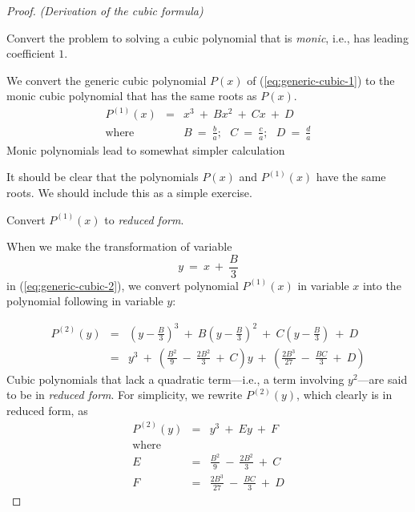 \begin{proof} {\it (Derivation of the cubic formula)}

 Convert the problem to solving a
cubic polynomial that is {\em monic}, 
i.e., has leading coefficient $1$.


\noindent
We convert the generic cubic polynomial $P(x)$ of
(\ref{eq:generic-cubic-1}) to the monic cubic polynomial that has the
same roots as $P(x)$.
\begin{eqnarray}
\label{eq:generic-cubic-2}
P^{(1)}(x) & = &  x^3 \ + \ Bx^2 \ + \ Cx \ + \ D \\
\nonumber
\mbox{where} & &
B \ = \ \frac{b}{a}; \ \ \
C \ = \ \frac{c}{a}; \ \ \
D \ = \ \frac{d}{a}
\end{eqnarray}
Monic polynomials lead to somewhat simpler calculation

It should be clear that the polynomials $P(x)$ and $P^{(1)}(x)$ have
the same roots.  {\Arny We should include this as a simple exercise.}

\medskip

 Convert $P^{(1)}(x)$ to {\em reduced form}.

\noindent
When we make the transformation of variable
\begin{equation}
\label{eq:cubic-substitute-y-for-x} 
y \ = \ x \ + \ \frac{B}{3}
\end{equation}
in (\ref{eq:generic-cubic-2}), we convert polynomial $P^{(1)}(x)$ in
variable $x$ into the polynomial following in variable $y$:

\begin{eqnarray}
\nonumber
P^{(2)}(y) & = &  \left(y - \frac{B}{3} \right)^3
 \ + \ B \left(y - \frac{B}{3} \right)^2
 \ + \ C \left(y - \frac{B}{3} \right) \ + \ D \\
\label{eq:generic-cubic-3}
           & = &
y^3 \ + \
\left( \frac{B^2}{9} \ - \ \frac{2B^2}{3} \ + \ C  \right) y
\ + \ \left( \frac{2 B^3}{27}  \ - \ \frac{BC}{3}  \ + \ D \right)
\end{eqnarray}
Cubic polynomials that lack a quadratic term---i.e., a term involving
$y^2$---are said to be in {\it reduced form}.  For simplicity, we
rewrite $P^{(2)}(y)$, which clearly is in reduced form, as
\begin{eqnarray}
\label{eq:generic-cubic-4}
P^{(2)}(y) & = & y^3 \ + \ E y \ + \ F \\
\nonumber
\mbox{where} & & \\
\nonumber
E & = & \frac{B^2}{9} \ - \ \frac{2B^2}{3} \ + \ C \\
\nonumber
F & = & \frac{2 B^3}{27}  \ - \ \frac{BC}{3}  \ + \ D
\end{eqnarray}



\end{proof}
